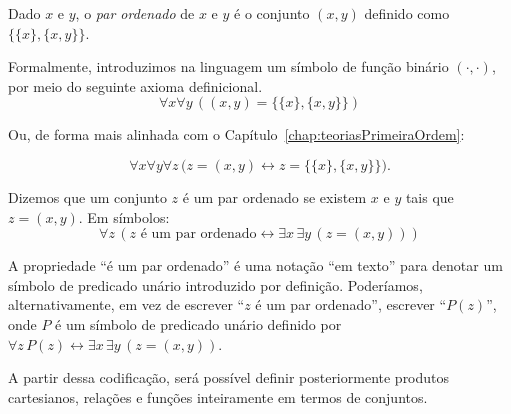 \begin{definition}[$\BST$]\label{def:parOrdenadoKuratowski}
    Dado $x$ e $y$, o \emph{par ordenado} de $x$ e $y$ é o conjunto $(x, y)$ definido como $\{\{x\}, \{x, y\}\}$.

    Formalmente, introduzimos na linguagem um símbolo de função binário $(\cdot, \cdot)$, por meio do seguinte axioma definicional.
    \[
        \forall x \forall y\, ((x, y) = \{\{x\}, \{x, y\}\})
    \]

    Ou, de forma mais alinhada com o Capítulo~\ref{chap:teoriasPrimeiraOrdem}:

    \[
        \forall x\forall y\forall z\,
        \bigl(z=(x,y)\leftrightarrow z=\{\{x\},\{x,y\}\}\bigr).
    \]

    Dizemos que um conjunto $z$ é um par ordenado se existem $x$ e $y$ tais que $z = (x, y)$.
    Em símbolos:
    \[
        \forall z\, (z \text{ é um par ordenado} \leftrightarrow \exists x\, \exists y\, (z = (x, y)))
    \]
\end{definition}

A propriedade ``é um par ordenado'' é uma notação ``em texto'' para denotar um símbolo de predicado unário introduzido por definição.
Poderíamos, alternativamente, em vez de escrever ``$z$ é um par ordenado'', escrever ``$P(z)$'', onde $P$ é um símbolo de predicado unário definido por $\forall z\, P(z) \leftrightarrow \exists x\, \exists y\, (z = (x, y))$. 

A partir dessa codificação, será possível definir posteriormente produtos cartesianos, relações e funções inteiramente em termos de conjuntos.

